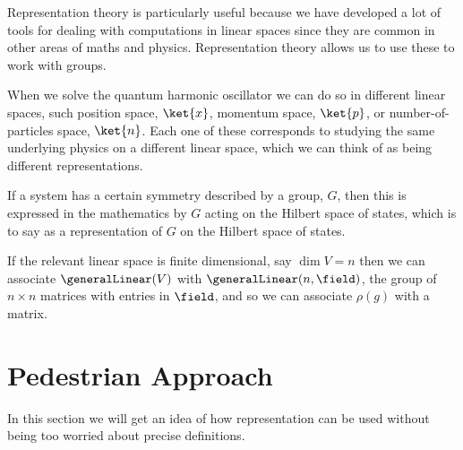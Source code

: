 \documentclass[fleqn]{NotesClass}
\begin{document}
    Representation theory is particularly useful because we have developed a lot of tools for dealing with computations in linear spaces since they are common in other areas of maths and physics.
    Representation theory allows us to use these to work with groups.
    
    \begin{app}{}{}
        When we solve the quantum harmonic oscillator we can do so in different linear spaces, such position space, \(\ket{x}\), momentum space, \(\ket{p}\), or number-of-particles space, \(\ket{n}\).
        Each one of these corresponds to studying the same underlying physics on a different linear space, which we can think of as being different representations.
        
        If a system has a certain symmetry described by a group, \(G\), then this is expressed in the mathematics by \(G\) acting on the Hilbert space of states, which is to say as a representation of \(G\) on the Hilbert space of states.
    \end{app}
    
    If the relevant linear space is finite dimensional, say \(\dim V = n\) then we can associate \(\generalLinear(V)\) with \(\generalLinear(n, \field)\), the group of \(n \times n\) matrices with entries in \(\field\), and so we can associate \(\rho(g)\) with a matrix.
    
    \section{Pedestrian Approach}
    \begin{rmk}
        In this section we will get an idea of how representation can be used without being too worried about precise definitions.
    \end{rmk}
    
\end{document}
